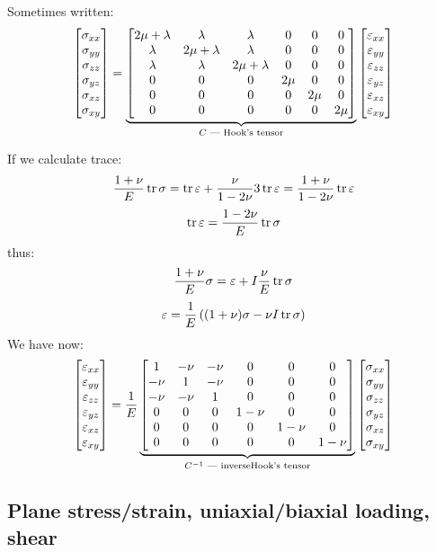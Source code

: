 \documentclass[12pt]{article}
\begin{document}
Sometimes written:
\[\left[\begin{matrix}\sigma_{xx}\\\sigma_{yy}\\\sigma_{zz}\\\sigma_{yz}\\\sigma_{xz}\\\sigma_{xy}\end{matrix}\right] = \underbrace{\left[\begin{matrix}
2\mu+\lambda&\lambda&\lambda&0&0&0\\
\lambda&2\mu+\lambda&\lambda&0&0&0\\
\lambda&\lambda&2\mu+\lambda&0&0&0\\
0&0&0&2\mu&0&0\\
0&0&0&0&2\mu&0\\
0&0&0&0&0&2\mu
\end{matrix}\right]}_{C\text{ --- Hook's tensor}}\left[\begin{matrix}\varepsilon_{xx}\\\varepsilon_{yy}\\\varepsilon_{zz}\\\varepsilon_{yz}\\\varepsilon_{xz}\\\varepsilon_{xy}\end{matrix}\right]\]

If we calculate trace:
\[\frac{1+\nu}{E}\operatorname{tr}\sigma = \operatorname{tr}\varepsilon + \frac{\nu}{1-2\nu} 3 \operatorname{tr}{\varepsilon} = \frac{1+\nu}{1-2\nu} \operatorname{tr}{\varepsilon}\]
\[\operatorname{tr}{\varepsilon} = \frac{1-2\nu}{E}\operatorname{tr}\sigma\]
thus:
\[\frac{1+\nu}{E}\sigma = \varepsilon + I \frac{\nu}{E}\operatorname{tr}\sigma\]
\[\varepsilon = \frac{1}{E}\left((1+\nu)\sigma - \nu I\operatorname{tr}\sigma\right)\]
We have now:
\[\left[\begin{matrix}\varepsilon_{xx}\\\varepsilon_{yy}\\\varepsilon_{zz}\\\varepsilon_{yz}\\\varepsilon_{xz}\\\varepsilon_{xy}\end{matrix}\right] = \frac{1}{E}\underbrace{\left[\begin{matrix}
1&-\nu&-\nu&0&0&0\\
-\nu&1&-\nu&0&0&0\\
-\nu&-\nu&1&0&0&0\\
0&0&0&1-\nu&0&0\\
0&0&0&0&1-\nu&0\\
0&0&0&0&0&1-\nu
\end{matrix}\right]}_{C^{-1}\text{ --- inverseHook's tensor}}\left[\begin{matrix}\sigma_{xx}\\\sigma_{yy}\\\sigma_{zz}\\\sigma_{yz}\\\sigma_{xz}\\\sigma_{xy}\end{matrix}\right]\]

\subsection{Plane stress/strain, uniaxial/biaxial loading, shear}
\end{document}
